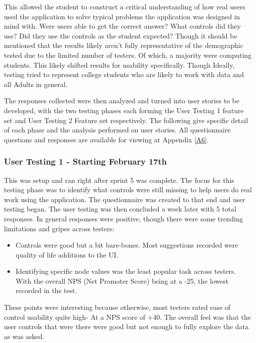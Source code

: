 This allowed the student to construct a critical understanding of how real users used the application to solve typical problems the application was designed in mind with. Were users able to get the correct answer? What controls did they use? Did they use the controls as the student expected? Though it should be mentioned that the results likely aren't fully representative of the demographic tested due to the limited number of testers. Of which, a majority were computing students. This likely shifted results for usability specifically. Though Ideally, testing tried to represent college students who are likely to work with data and all Adults in general.

The responses collected were then analyzed and turned into user stories to be developed, with the two testing phases each forming the User Testing 1 feature set and User Testing 2 Feature set respectively. The following give specific detail of each phase and the analysis performed on user stories. All questionnaire questions and responses are available for viewing at Appendix \ref{A6}.

\subsubsection{User Testing 1 - Starting February 17th}
This was setup and ran right after sprint 5 was complete. The focus for this testing phase was to identify what controls were still missing to help users do real work using the application. The questionnaire was created to that end and user testing began. The user testing was then concluded a week later with 5 total responses. In general responses were positive, though there were some trending limitations and gripes across testers:

\begin{itemize}
    \item Controls were good but a bit bare-bones. Most suggestions recorded were quality of life additions to the UI.
    \item Identifying specific node values was the least popular task across testers. With the overall NPS (Net Promoter Score) being at a -25, the lowest recorded in the test.
\end{itemize}

These points were interesting because otherwise, most testers rated ease of control usability quite high- At a NPS score of +40. The overall feel was that the user controls that were there were good but not enough to fully explore the data as was asked.

